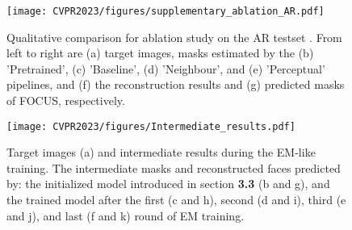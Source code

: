 \documentclass[10pt,twocolumn,letterpaper]{article}
\begin{document}
\begin{figure}
  \centering
  
  \texttt{[image: CVPR2023/figures/supplementary\_ablation\_AR.pdf]}

  \caption{Qualitative comparison for ablation study on the AR testset \cite{ARdataset}. From left to right are (a) target images, masks estimated by the (b) ’Pretrained’, (c) ’Baseline’, (d) ’Neighbour’, and (e) ’Perceptual’ pipelines, and (f) the reconstruction results and (g) predicted masks of FOCUS, respectively.}
  \label{Visual Comparison:ablation AR}
\end{figure}



\begin{figure*}
  \centering
  
  \texttt{[image: CVPR2023/figures/Intermediate\_results.pdf]}

  \caption{Target images (a) and intermediate results during the EM-like training. The intermediate masks and reconstructed faces predicted by: the initialized model introduced in section \textbf{3.3} (b and g), and the trained model after the first (c and h), second  (d and i), third (e and j), and last (f and k) round of EM training.}
  \label{Intermediate Results}
\end{figure*}
\end{document}

